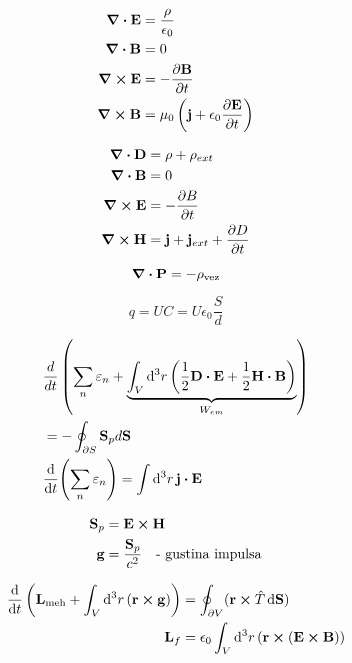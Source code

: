 \documentclass[11pt,twoside]{article}
\begin{document}
\begin{multicols}{3}
\begin{equation}
\begin{split}
\div\vb{E} &= \frac{\rho}{\epsilon_0} \\
\div\vb{B} &= 0 \\
\curl \vb{E} &= -\frac{\partial\vb{B}}{\partial t} \\
\curl \vb{B} &= \mu_0 \left( \vb{j} + \epsilon_0 \frac{\partial\vb{E}}{\partial t} \right)
\end{split}
\end{equation}

\begin{equation}
\begin{split}
\div\vb{D} &= \rho + \rho_{ext} \\
\div\vb{B} &= 0 \\
\curl \vb{E} &= - \frac{\partial B}{\partial t} \\
\curl \vb{H} &= \vb{j} + \vb{j}_{ext} + \frac{\partial D}{\partial t}
\end{split}
\end{equation}

\begin{equation}
\div{\vb{P}}=-\rho_{\text{vez}}
\end{equation}

\begin{equation}
q = U C = U \epsilon_0 \frac{S}{d}
\end{equation}

\begin{equation}
\begin{split}
&\frac{d}{dt} \left( \sum_n \varepsilon_n + \underbrace{\int_V \dd[3]{r} \left( \frac{1}{2} \vb{D}\vdot\vb{E} + \frac{1}{2}\vb{H}\vdot\vb{B} \right)}_{W_{em}} \right) \\ &= -\oint_{\partial S} \vb{S}_p d\vb{S} \\
&\dv{t} (\sum_n \varepsilon_n ) = \int \dd[3]{r}\vb{j}\vdot\vb{E}
\end{split}
\end{equation}

\begin{equation}
\begin{split}
\vb{S}_p &= \vb{E}\cross\vb{H} \\
\vb{g} &= \frac{\vb{S}_p}{c^2} \quad \text{- gustina impulsa}
\end{split}
\end{equation}

\begin{equation}
\begin{split}
\dv{t}\left(\vb{L}_{\text{meh}} + \int_V \dd[3]{r} (\vb{r}\cross\vb{g})\right) &= \oint_{\partial V}(\vb{r}\cross \hat{T}\dd{\vb{S}}) \\
\vb{L}_f &= \epsilon_0 \int_V \dd[3]{r} (\vb{r}\cross(\vb{E}\cross\vb{B}))
\end{split}
\end{equation}


\end{multicols}
\end{document}
